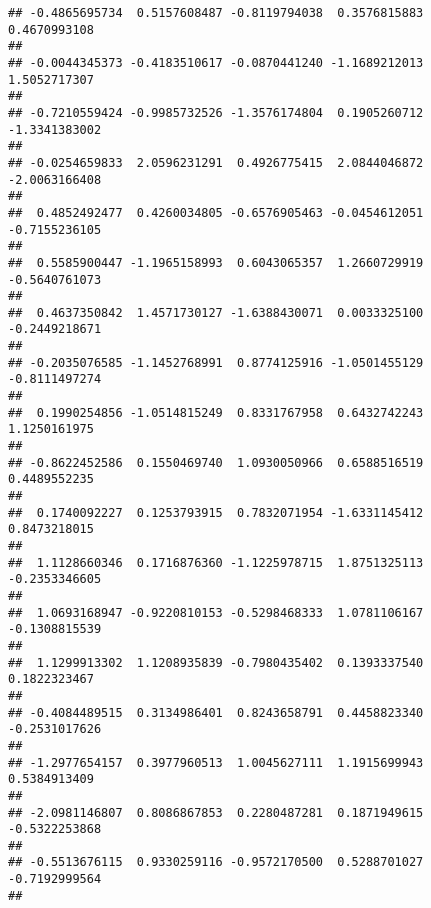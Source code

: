 \documentclass[]{article}
\begin{document}
\begin{verbatim}
## -0.4865695734  0.5157608487 -0.8119794038  0.3576815883  0.4670993108 
##                                                                       
## -0.0044345373 -0.4183510617 -0.0870441240 -1.1689212013  1.5052717307 
##                                                                       
## -0.7210559424 -0.9985732526 -1.3576174804  0.1905260712 -1.3341383002 
##                                                                       
## -0.0254659833  2.0596231291  0.4926775415  2.0844046872 -2.0063166408 
##                                                                       
##  0.4852492477  0.4260034805 -0.6576905463 -0.0454612051 -0.7155236105 
##                                                                       
##  0.5585900447 -1.1965158993  0.6043065357  1.2660729919 -0.5640761073 
##                                                                       
##  0.4637350842  1.4571730127 -1.6388430071  0.0033325100 -0.2449218671 
##                                                                       
## -0.2035076585 -1.1452768991  0.8774125916 -1.0501455129 -0.8111497274 
##                                                                       
##  0.1990254856 -1.0514815249  0.8331767958  0.6432742243  1.1250161975 
##                                                                       
## -0.8622452586  0.1550469740  1.0930050966  0.6588516519  0.4489552235 
##                                                                       
##  0.1740092227  0.1253793915  0.7832071954 -1.6331145412  0.8473218015 
##                                                                       
##  1.1128660346  0.1716876360 -1.1225978715  1.8751325113 -0.2353346605 
##                                                                       
##  1.0693168947 -0.9220810153 -0.5298468333  1.0781106167 -0.1308815539 
##                                                                       
##  1.1299913302  1.1208935839 -0.7980435402  0.1393337540  0.1822323467 
##                                                                       
## -0.4084489515  0.3134986401  0.8243658791  0.4458823340 -0.2531017626 
##                                                                       
## -1.2977654157  0.3977960513  1.0045627111  1.1915699943  0.5384913409 
##                                                                       
## -2.0981146807  0.8086867853  0.2280487281  0.1871949615 -0.5322253868 
##                                                                       
## -0.5513676115  0.9330259116 -0.9572170500  0.5288701027 -0.7192999564 
##                                                                       

\end{verbatim}
\end{document}
